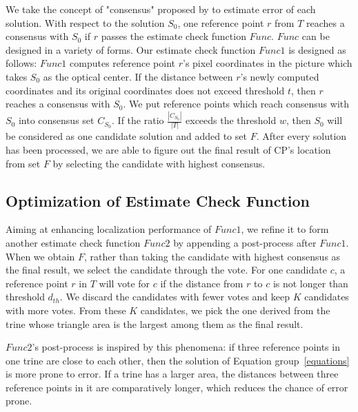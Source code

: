We take the concept of "consensus" proposed by \cite{fischler1981random} to estimate error of each solution. With respect to the solution $S_0$, one reference point $r$ from $T$ reaches a consensus with $S_0$ if $r$ passes the estimate check function $Func$. $Func$ can be designed in a variety of forms. Our estimate check function $Func1$ is designed as follows: $Func1$ computes reference point $r$'s pixel coordinates in the picture which takes $S_0$ as the optical center. If the distance between $r$'s newly computed coordinates and its original coordinates does not exceed threshold $t$, then $r$ reaches a consensus with $S_0$. We put reference points which reach consensus with $S_0$ into consensus set $C_{S_0}$. If the ratio $\frac{|C_{S_0}|}{|T|}$ exceeds the threshold $w$, then $S_0$ will be considered as one candidate solution and added to set $F$. After every solution has been processed, we are able to figure out the final result of CP's location from set $F$ by selecting the candidate with highest consensus.
\subsection{Optimization of Estimate Check Function}
Aiming at enhancing localization performance of $Func1$, we refine it to form another estimate check function $Func2$ by appending a post-process after $Func1$. When we obtain $F$, rather than taking the candidate with highest consensus as the final result, we select the candidate through the vote. For one candidate $c$, a reference point $r$ in $T$ will vote for $c$ if the distance from $r$ to $c$ is not longer than threshold $d_{th}$. We discard the candidates with fewer votes and keep $K$ candidates with more votes. From these $K$ candidates, we pick the one derived from the trine whose triangle area is the largest among them as the final result.

$Func2$'s post-process is inspired by this phenomena: if three reference points in one trine are close to each other, then the solution of Equation group~\ref{equations} is more prone to error. If a trine has a larger area, the distances between three reference points in it are comparatively longer, which reduces the chance of error prone.



